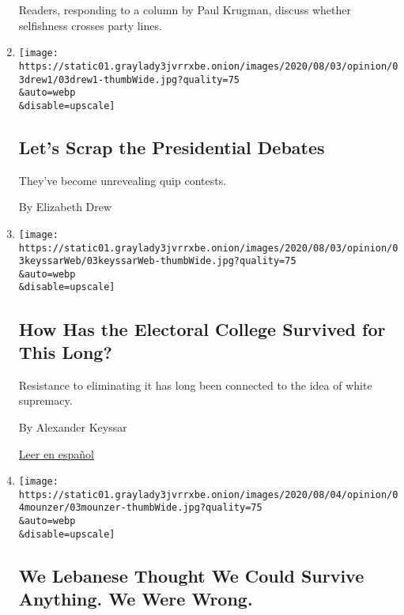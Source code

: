 \begin{enumerate}
  Readers, responding to a column by Paul Krugman, discuss whether
  selfishness crosses party lines.
\item
  \href{/2020/08/03/opinion/trump-biden-presidential-debates-2020.html}{}

  \texttt{[image: https://static01.graylady3jvrrxbe.onion/images/2020/08/03/opinion/03drew1/03drew1-thumbWide.jpg?quality=75\\\&auto=webp\\\&disable=upscale]}

  \hypertarget{lets-scrap-the-presidential-debates}{%
  \subsection{Let's Scrap the Presidential
  Debates}\label{lets-scrap-the-presidential-debates}}

  They've become unrevealing quip contests.

  By Elizabeth Drew
\item
  \href{/2020/08/03/opinion/electoral-college-racism-white-supremacy.html}{}

  \texttt{[image: https://static01.graylady3jvrrxbe.onion/images/2020/08/03/opinion/03keyssarWeb/03keyssarWeb-thumbWide.jpg?quality=75\\\&auto=webp\\\&disable=upscale]}

  \hypertarget{how-has-the-electoral-college-survived-for-this-long}{%
  \subsection{How Has the Electoral College Survived for This
  Long?}\label{how-has-the-electoral-college-survived-for-this-long}}

  Resistance to eliminating it has long been connected to the idea of
  white supremacy.

  By Alexander Keyssar

  \href{https://www.nytimes3xbfgragh.onion/es/2020/08/03/espanol/opinion/colegio-electoral-estados-unidos.html}{Leer
  en español}
\item
  \href{/2020/08/03/opinion/lebanon-coronavirus-economy.html}{}

  \texttt{[image: https://static01.graylady3jvrrxbe.onion/images/2020/08/04/opinion/04mounzer/03mounzer-thumbWide.jpg?quality=75\\\&auto=webp\\\&disable=upscale]}

  \hypertarget{we-lebanese-thought-we-could-survive-anything-we-were-wrong}{%
  \subsection{We Lebanese Thought We Could Survive Anything. We Were
  Wrong.}\label{we-lebanese-thought-we-could-survive-anything-we-were-wrong}}


\end{enumerate}
